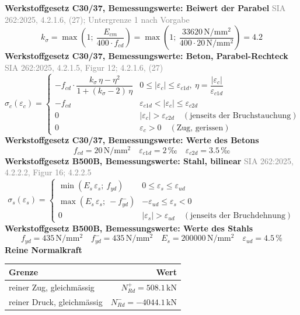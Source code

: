 \documentclass[11pt,a4paper]{article}
\newcommand{\normref}[1]{{\small\textcolor{gray}{#1}}}
\begin{document}
\noindent\textbf{Werkstoffgesetz C30/37, Bemessungswerte: Beiwert der Parabel} \hfill \normref{SIA 262:2025, 4.2.1.6, (27); Untergrenze 1 nach Vorgabe}
\begin{equation*}
k_{\sigma} = \max\left(1;\ \frac{E_{cm}}{400 \cdot f_{cd}}\right) = \max\left(1;\ \frac{33620\,\mathrm{N}/\mathrm{mm}^{2}}{400 \cdot 20\,\mathrm{N}/\mathrm{mm}^{2}}\right) = 4.2
\end{equation*}
\noindent\textbf{Werkstoffgesetz C30/37, Bemessungswerte: Beton, Parabel-Rechteck} \hfill \normref{SIA 262:2025, 4.2.1.5, Figur 12; 4.2.1.6, (27)}
\begin{equation*}
\sigma_c(\varepsilon_c) = \begin{cases} -f_{cd} \cdot \dfrac{k_\sigma\,\eta - \eta^2}{1 + (k_\sigma - 2)\,\eta} & 0 \le |\varepsilon_c| \le \varepsilon_{c1d},\ \eta = \dfrac{|\varepsilon_c|}{\varepsilon_{c1d}} \\[2ex] -f_{cd} & \varepsilon_{c1d} < |\varepsilon_c| \le \varepsilon_{c2d} \\[1ex] 0 & |\varepsilon_c| > \varepsilon_{c2d} \quad (\text{jenseits der Bruchstauchung}) \\[1ex] 0 & \varepsilon_c > 0 \quad (\text{Zug, gerissen}) \end{cases}
\end{equation*}
\noindent\textbf{Werkstoffgesetz C30/37, Bemessungswerte: Werte des Betons}
\begin{equation*}
f_{cd} = 20\,\mathrm{N}/\mathrm{mm}^{2} \quad \varepsilon_{c1d} = 2\,\text{‰} \quad \varepsilon_{c2d} = 3.5\,\text{‰}
\end{equation*}
\noindent\textbf{Werkstoffgesetz B500B, Bemessungswerte: Stahl, bilinear} \hfill \normref{SIA 262:2025, 4.2.2.2, Figur 16; 4.2.2.5}
\begin{equation*}
\sigma_s(\varepsilon_s) = \begin{cases} \min(E_s\,\varepsilon_s;\ f_{yd}) & 0 \le \varepsilon_s \le \varepsilon_{ud} \\[1ex] \max(E_s\,\varepsilon_s;\ -f_{yd}^{-}) & -\varepsilon_{ud} \le \varepsilon_s < 0 \\[1ex] 0 & |\varepsilon_s| > \varepsilon_{ud} \quad (\text{jenseits der Bruchdehnung}) \end{cases}
\end{equation*}
\noindent\textbf{Werkstoffgesetz B500B, Bemessungswerte: Werte des Stahls}
\begin{equation*}
f_{yd} = 435\,\mathrm{N}/\mathrm{mm}^{2} \quad f_{yd}^{-} = 435\,\mathrm{N}/\mathrm{mm}^{2} \quad E_s = 200000\,\mathrm{N}/\mathrm{mm}^{2} \quad \varepsilon_{ud} = 4.5\,\%
\end{equation*}
\noindent\textbf{Reine Normalkraft}
\begin{longtable}{lr}
\hline
Grenze & Wert \\
\hline
\endhead
reiner Zug, gleichmässig & $N_{Rd}^{+} = 508.1\,\mathrm{kN}$ \\
reiner Druck, gleichmässig & $N_{Rd}^{-} = -4044.1\,\mathrm{kN}$ \\
\hline
\end{longtable}
\end{document}
